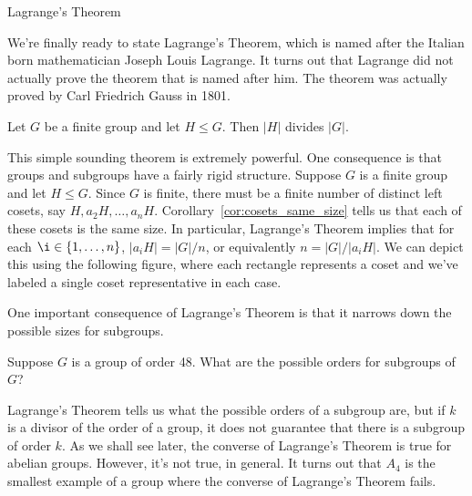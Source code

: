 \begin{section}{Lagrange's Theorem}

We're finally ready to state Lagrange's Theorem, which is named after the Italian born mathematician Joseph Louis Lagrange.  It turns out that Lagrange did not actually prove the theorem that is named after him.  The theorem was actually proved by Carl Friedrich Gauss in 1801.

\begin{theorem}
Let \(G\) be a finite group and let \(H\leq G\).  Then \(|H|\) divides \(|G|\).
\end{theorem}

This simple sounding theorem is extremely powerful.  One consequence is that groups and subgroups have a fairly rigid structure.  Suppose \(G\) is a finite group and let \(H\leq G\).  Since \(G\) is finite, there must be a finite number of distinct left cosets, say \(H, a_2H, \ldots, a_{n}H\).  Corollary~\ref{cor:cosets_same_size} tells us that each of these cosets is the same size.  In particular, Lagrange's Theorem implies that for each \(\i\in\{1,\ldots, n\}\), \(|a_iH|=|G|/n\), or equivalently \(n=|G|/|a_iH|\).  We can depict this using the following figure, where each rectangle represents a coset and we've labeled a single coset representative in each case.

\begin{center}
\end{center}

One important consequence of Lagrange's Theorem is that it narrows down the possible sizes for subgroups.

\begin{exercise}
Suppose \(G\) is a group of order 48.  What are the possible orders for subgroups of \(G\)?  
\end{exercise}

Lagrange's Theorem tells us what the possible orders of a subgroup are, but if \(k\) is a divisor of the order of a group, it does not guarantee that there is a subgroup of order \(k\).  As we shall see later, the converse of Lagrange's Theorem is true for abelian groups.  However, it's not true, in general.  It turns out that \(A_4\) is the smallest example of a group where the converse of Lagrange's Theorem fails.


\end{section}
